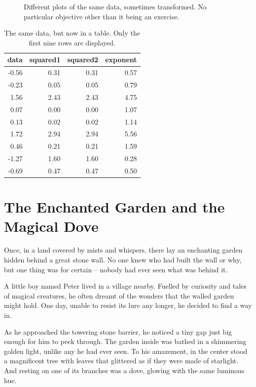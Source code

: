 \documentclass[10pt, a4paper, titlepage]{article}
\begin{document}
\begin{figure}[htbp]
    \caption{Different plots of the same data, sometimes transformed. No particular objective other than it being an exercise.}
    \label{fig:main}
\end{figure}

\begin{table}[!h]
\centering
\caption{The same data, but now in a table. Only the first nine rows are displayed.} 
\begin{tabular}{rrrr}
  \hline
data & squared1 & squared2 & exponent \\ 
  \hline
-0.56 & 0.31 & 0.31 & 0.57 \\ 
  -0.23 & 0.05 & 0.05 & 0.79 \\ 
  1.56 & 2.43 & 2.43 & 4.75 \\ 
  0.07 & 0.00 & 0.00 & 1.07 \\ 
  0.13 & 0.02 & 0.02 & 1.14 \\ 
  1.72 & 2.94 & 2.94 & 5.56 \\ 
  0.46 & 0.21 & 0.21 & 1.59 \\ 
  -1.27 & 1.60 & 1.60 & 0.28 \\ 
  -0.69 & 0.47 & 0.47 & 0.50 \\ 
   \hline
\end{tabular}
\end{table}

\section{The Enchanted Garden and the Magical Dove}

Once, in a land covered by mists and whispers, there lay an enchanting garden hidden behind a great stone wall. No one knew who had built the wall or why, but one thing was for certain – nobody had ever seen what was behind it.

A little boy named Peter lived in a village nearby. Fuelled by curiosity and tales of magical creatures, he often dreamt of the wonders that the walled garden might hold. One day, unable to resist its lure any longer, he decided to find a way in.

As he approached the towering stone barrier, he noticed a tiny gap just big enough for him to peek through. The garden inside was bathed in a shimmering golden light, unlike any he had ever seen. To his amazement, in the center stood a magnificent tree with leaves that glittered as if they were made of starlight. And resting on one of its branches was a dove, glowing with the same luminous hue.
\end{document}
